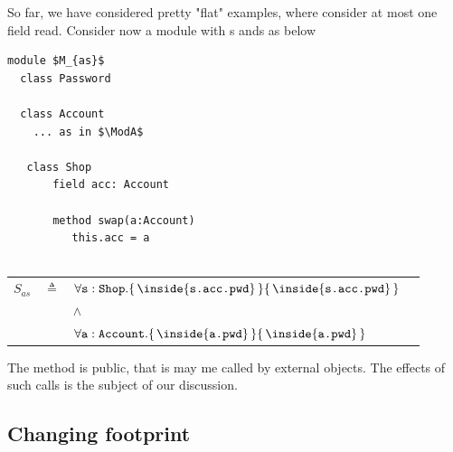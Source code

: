  So far, we have considered pretty "flat" examples, where consider  at most one field read. Consider now a module with s ands as below

\begin{lstlisting}[mathescape=true, language=Chainmail, frame=lines]
module $M_{as}$        
  class Password
  
  class Account
    ... as in $\ModA$
    
   class Shop
       field acc: Account
       
       method swap(a:Account)
          this.acc = a
    
\end{lstlisting}
%
  

 \begin{tabular}{lcll}
 $S_{as}$   & $\triangleq$   &  $\TwoStatesQ {\prg{s}:\prg{Shop}}  {\inside{\prg{s.acc.pwd}}}  {\inside{\prg{s.acc.pwd}}}$
 \\
 & & $\wedge$ \\
 & & $\TwoStatesQ {\prg{a}:\prg{Account}}  {\inside{\prg{a.pwd}}}  {\inside{\prg{a.pwd}}}$
 \end{tabular}
 
 The method  is public, that is may me called by external objects. The effects of such calls is the subject of our discussion.
  
\subsection{Changing footprint}  

